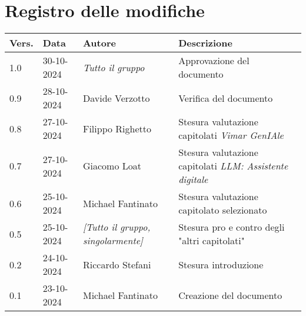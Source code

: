 \section*{Registro delle modifiche}

\begin{table}[h]
    \centering
    \begin{tabular}{|l|l|p{3cm}|p{5cm}|}
        \hline
        \rowcolor[gray]{0.9}
        \textbf{Vers.} & \textbf{Data} & \textbf{Autore} & \textbf{Descrizione}\\
        \hline
        1.0 & 30-10-2024 & \emph{Tutto il gruppo} & Approvazione del documento\\
        \hline
        0.9 & 28-10-2024 & Davide Verzotto & Verifica del documento\\
        \hline
        0.8 & 27-10-2024 & Filippo Righetto & Stesura valutazione capitolati \emph{Vimar GenIAle}\\
        \hline
        0.7 & 27-10-2024 & Giacomo Loat & Stesura valutazione capitolati \emph{LLM: Assistente digitale}\\
        \hline
        0.6 & 25-10-2024 & Michael Fantinato & Stesura valutazione capitolato selezionato\\
        \hline
        0.5 & 25-10-2024 & \emph{[Tutto il gruppo, singolarmente]} & Stesura pro e contro degli "altri capitolati"\\
        \hline
        0.2 & 24-10-2024 & Riccardo Stefani & Stesura introduzione\\
        \hline
        0.1 & 23-10-2024 & Michael Fantinato & Creazione del documento\\
        \hline
    \end{tabular}
\end{table}
